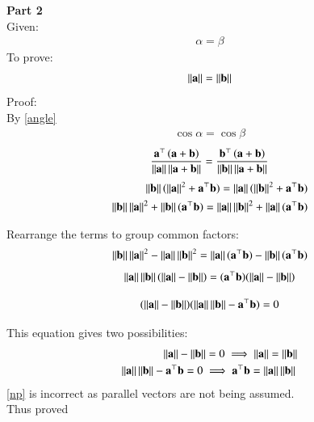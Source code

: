 \documentclass[journal]{IEEEtran}
\begin{document}
	\textbf{Part 2}\\
	Given:
	\begin{align}
		\alpha=\beta
	\end{align}
	To prove:
	\begin{align}
		\norm{\vec{a}} = \norm{\vec{b}} 
	\end{align}
	Proof:\\
	By \eqref{angle}
	\begin{align}
		\cos{\alpha}=\cos{\beta}
	\end{align}
	\begin{align}
		\frac{\vec{a}^\top\brak{\vec{a}+\vec{b}}}{\norm{\vec{a}}\norm{\vec{a}+\vec{b}}} = \frac{\vec{b}^\top\brak{\vec{a}+\vec{b}}}{\norm{\vec{b}}\norm{\vec{a}+\vec{b}}}
	\end{align}
	\begin{align}
		\norm{\vec{b}} (\norm{\vec{a}}^2 + \vec{a}^\top\vec{b}) = \norm{\vec{a}} (\norm{\vec{b}}^2 + \vec{a}^\top\vec{b}) \\
		\norm{\vec{b}}\norm{\vec{a}}^2 + \norm{\vec{b}}(\vec{a}^\top\vec{b}) = \norm{\vec{a}}\norm{\vec{b}}^2 + \norm{\vec{a}}(\vec{a}^\top\vec{b})
	\end{align}
	
	Rearrange the terms to group common factors:
	\begin{align}
		\norm{\vec{b}}\norm{\vec{a}}^2 - \norm{\vec{a}}\norm{\vec{b}}^2 = \norm{\vec{a}}(\vec{a}^\top\vec{b}) - \norm{\vec{b}}(\vec{a}^\top\vec{b})
	\end{align}
	\begin{align}
		\norm{\vec{a}}\norm{\vec{b}} (\norm{\vec{a}} - \norm{\vec{b}}) = (\vec{a}^\top\vec{b}) (\norm{\vec{a}} - \norm{\vec{b}})
	\end{align}
	
	\begin{align}
		(\norm{\vec{a}} - \norm{\vec{b}}) (\norm{\vec{a}}\norm{\vec{b}} - \vec{a}^\top\vec{b}) = 0
	\end{align}
	
	This equation gives two possibilities:
	\begin{align}
		\norm{\vec{a}} - \norm{\vec{b}} = 0 \implies \norm{\vec{a}} = \norm{\vec{b}}\\
		\norm{\vec{a}}\norm{\vec{b}} - \vec{a}^\top\vec{b} = 0 \implies \vec{a}^\top\vec{b} = \norm{\vec{a}}\norm{\vec{b}}\text{} \label{np}
	\end{align}
	\eqref{np} is incorrect as parallel vectors are not being assumed.\\
	Thus proved
	
\end{document}
